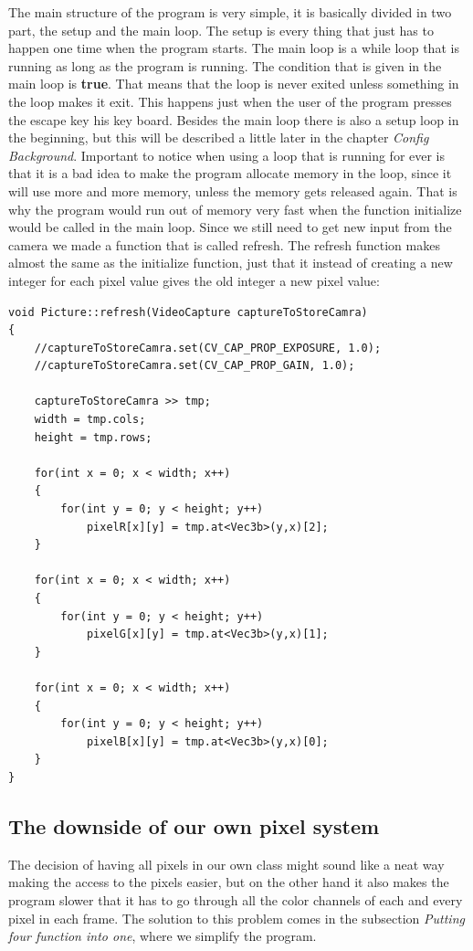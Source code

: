 The main structure of the program is very simple, it is basically divided in two part, the setup and the main loop. The setup is every thing that just has to happen one time when the program starts. The main loop is a while loop that is running as long as the program is running. The condition that is given in the main loop is \textbf{true}. That means that the loop is never exited unless something in the loop makes it exit. This happens just when the user of the program presses the escape key his key board.
Besides the main loop there is also a setup loop in the beginning, but this will be described a little later in the chapter \textit{Config Background}. 
Important to notice when using a loop that is running for ever is that it is a bad idea to make the program allocate memory in the loop, since it will use more and more memory, unless the memory gets released again. That is why the program would run out of memory very fast when the function initialize would be called in the main loop. Since we still need to get new input from the camera we made a function that is called refresh. The refresh function makes almost the same as the initialize function, just that it instead of creating a new integer for each pixel value gives the old integer a new pixel value:

\begin{lstlisting}
void Picture::refresh(VideoCapture captureToStoreCamra)
{
	//captureToStoreCamra.set(CV_CAP_PROP_EXPOSURE, 1.0);
	//captureToStoreCamra.set(CV_CAP_PROP_GAIN, 1.0);

	captureToStoreCamra >> tmp;
	width = tmp.cols;
	height = tmp.rows;

	for(int x = 0; x < width; x++)
	{
		for(int y = 0; y < height; y++)
			pixelR[x][y] = tmp.at<Vec3b>(y,x)[2];
	}

	for(int x = 0; x < width; x++)
	{
		for(int y = 0; y < height; y++)
			pixelG[x][y] = tmp.at<Vec3b>(y,x)[1];
	}

	for(int x = 0; x < width; x++)
	{
		for(int y = 0; y < height; y++)
			pixelB[x][y] = tmp.at<Vec3b>(y,x)[0];
	}
}
\end{lstlisting}

\subsection{The downside of our own pixel system}

The decision of having all pixels in our own class might sound like a neat way making the access to the pixels easier, but on the other hand it also makes the program slower that it has to go through all the color channels of each and every pixel in each frame. The solution to this problem comes in the subsection \textit{Putting four function into one}, where we simplify the program. 

